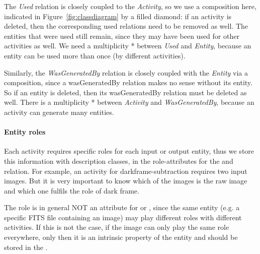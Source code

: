The \emph{Used} relation is closely coupled to the \emph{Activity}, so we use a composition here, indicated
in Figure~\ref{fig:classdiagram} by a filled diamond: 
if an activity is deleted, then the corresponding used relations need to be removed as well. 
The entities that were used still remain, since they may have been used for other activities as well.
We need a multiplicity * between \emph{Used} and \emph{Entity}, because an entity can be used more than once
(by different activities).

Similarly, the \emph{WasGeneratedBy} relation is closely coupled with the \emph{Entity} via a composition,
since a wasGeneratedBy relation makes no sense without its entity. So if an entity is deleted, 
then its wasGeneratedBy relation must be deleted as well. There is a multiplicity * between \emph{Activity}
and \emph{WasGeneratedBy}, because an activity can generate many entities.


\paragraph{Entity roles}\label{sec:entity-roles}
Each activity requires specific roles for each input or output entity, thus 
we store this information with description classes, in the role-attributes for 
the  and  relation.
For example, an activity for darkframe-subtraction requires two input images. But it is 
very important to know which of the images is the raw image and 
which one fulfils the role of dark frame.

The role is in general NOT an attribute for  or , 
since the same entity (e.g. a specific FITS file containing an image) may play 
different roles with different activities. If this is not the case, if the 
image can only play the same role everywhere, only then it is an intrinsic 
property of the entity and should be stored in the .



